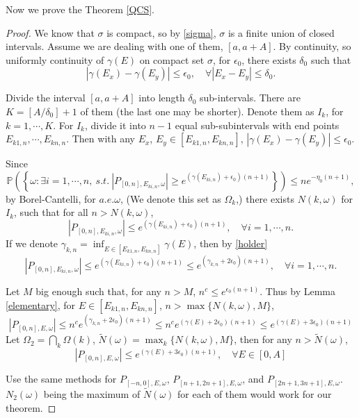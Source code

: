 Now we prove the Theorem \ref{QCS}.
\begin{proof}
We know that $\sigma$ is compact, so by \eqref{sigma}, $\sigma$ is a finite union of closed intervals. Assume we are dealing with one of them, $[a,a+A]$. By continuity, so uniformly continuity of $\gamma(E)$ on compact set $\sigma$, for $\epsilon_0$, there exists $\delta_0$ such that
\begin{equation}\label{holder}
|\gamma(E_x)-\gamma(E_y)|\leq \epsilon_0,\quad \forall |E_x-E_y|\leq \delta_0.
\end{equation}

Divide the interval $[a,a+A]$ into length $\delta_0$ sub-intervals. There are $K=[A/\delta_0]+1$ of them (the last one may be shorter). Denote them as $I_k$, for $k=1,\cdots, K$. For $I_k$, divide it into $n-1$ equal sub-subintervals with end points $E_{k1,n},\cdots,E_{kn,n}$. Then with any $E_x$, $E_y\in [E_{k1,n},E_{kn,n}]$, $|\gamma(E_x)-\gamma(E_y)|\leq \epsilon_0$.

Since
\[
\mathbb{P}\left(\left\{\omega:  \exists i=1,\cdots,n,~s.t.~|P_{[0,n],E_{ki,n},\omega}|\geq e^{(\gamma(E_{ki,n})+\epsilon_0)(n+1)} \right\}\right)\leq ne^{-\eta_0(n+1)},
\]
by Borel-Cantelli, for $a.e.\omega$, (We denote this set as $\Omega_{k}$,) there exists $N(k, \omega)$ for $I_k$, such that for all $n>N(k,\omega)$,
\[
|P_{[0,n],E_{ki,n},\omega}|\leq e^{(\gamma(E_{ki,n})+\epsilon_0)(n+1)},\quad \forall i=1,\cdots,n.
\]
If we denote $\gamma_{k,n}=\inf_{E\in [E_{k1,n},E_{kn,n}]}{\gamma(E)}$, then by \eqref{holder}
\[
|P_{[0,n],E_{ki,n},\omega}|\leq e^{(\gamma(E_{ki,n})+\epsilon_0)(n+1)}\leq e^{(\gamma_{k,n}+2\epsilon_0)(n+1)}, \quad \forall i=1,\cdots,n.
\]

Let $M$ big enough such that, for any $n>M$, $n^c\leq e^{\epsilon_0(n+1)}$. Thus by Lemma \ref{elementary}, for $E\in[E_{k1,n},E_{kn,n}]$, $n>\max\{N(k,\omega),M\}$,
\[
|P_{[0,n],E,\omega}|\leq n^ce^{(\gamma_{k,n}+2\epsilon_0)(n+1)}\leq n^ce^{(\gamma(E)+2\epsilon_0)(n+1)}\leq e^{(\gamma(E)+3\epsilon_0)(n+1)}
\]
Let $\Omega_2=\bigcap\limits_k \Omega(k)$,  $\tilde{N}(\omega)=\max_k\{N(k,\omega),M\}$, then for any $n>\tilde{N}(\omega)$,
\[
|P_{[0,n],E,\omega}|\leq e^{(\gamma(E)+3\epsilon_0)(n+1)},\quad \forall E\in [0,A]
\]

Use the same methods for $P_{[-n,0],E,\omega}$, $P_{[n+1,2n+1],E,\omega}$, and $P_{[2n+1,3n+1],E,\omega}$. $N_2(\omega)$ being the maximum of $\tilde{N}(\omega)$ for each of them would work for our theorem.
\end{proof}
